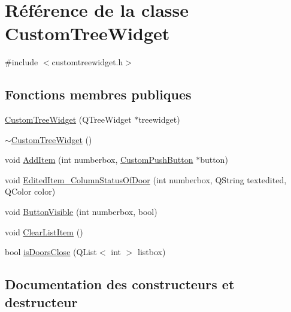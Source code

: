 \hypertarget{class_custom_tree_widget}{}\section{Référence de la classe Custom\+Tree\+Widget}
\label{class_custom_tree_widget}


{\ttfamily \#include $<$customtreewidget.\+h$>$}

\subsection*{Fonctions membres publiques}
\begin{DoxyCompactItemize}
\item 
\hyperlink{class_custom_tree_widget_ae24ab113af3b2774d1730a7cd55471e2}{Custom\+Tree\+Widget} (Q\+Tree\+Widget $\ast$treewidget)
\item 
\hyperlink{class_custom_tree_widget_a2a082e756efd517f3a71e7e67e1f32f6}{$\sim$\+Custom\+Tree\+Widget} ()
\item 
void \hyperlink{class_custom_tree_widget_a4abeb5cd859226e4cbe2b83e941c3aea}{Add\+Item} (int numberbox, \hyperlink{class_custom_push_button}{Custom\+Push\+Button} $\ast$button)
\item 
void \hyperlink{class_custom_tree_widget_a8c4ea47a57e7301097702c7aa04d2c58}{Edited\+Item\+\_\+\+Column\+Status\+Of\+Door} (int numberbox, Q\+String textedited, Q\+Color color)
\item 
void \hyperlink{class_custom_tree_widget_a4919b08a8230f1afc200c00f947d031d}{Button\+Visible} (int numberbox, bool)
\item 
void \hyperlink{class_custom_tree_widget_ae144f5edf4f360d34230c84f2d6d06f2}{Clear\+List\+Item} ()
\item 
bool \hyperlink{class_custom_tree_widget_a04467023e71a82a7f292101ee3d1f1f6}{is\+Doors\+Close} (Q\+List$<$ int $>$ listbox)
\end{DoxyCompactItemize}


\subsection{Documentation des constructeurs et destructeur}
\hypertarget{class_custom_tree_widget_ae24ab113af3b2774d1730a7cd55471e2}{}
